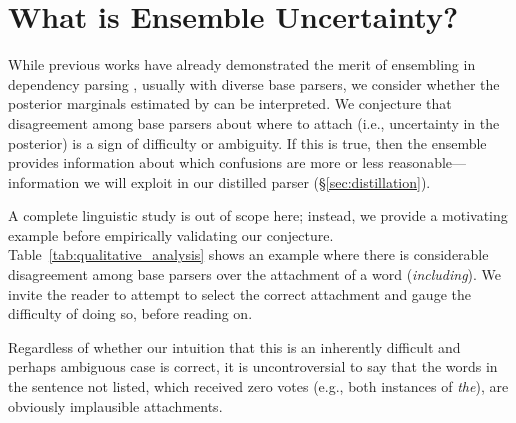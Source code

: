 \documentclass[11pt,letterpaper]{article}
\newcommand{\ignore}[1]{}
\newcommand{\nascomment}[1]{\ignore{\textcolor{blue}{{\textbf{[#1 --\textsc{nas}]}}}}}
\begin{document}
\ignore{\nascomment{need to explicitly compare to SOTA if we are going to claim it.  I have done so.}}
\section{What is Ensemble Uncertainty?}\label{sec:ensemble_ambiguity}

While previous works have already demonstrated the merit of ensembling in dependency parsing \cite{ensemble_reparsing,ensemble_cheap_and_good}, usually with diverse base parsers, we consider whether the posterior
marginals estimated by  can be interpreted.  
We conjecture that disagreement among base parsers about where to attach  (i.e., uncertainty in the posterior) is a sign of difficulty or ambiguity.  If this is true, then the ensemble provides information about which confusions are more or less reasonable---information we will exploit in our distilled  parser (\S\ref{sec:distillation}).

A complete linguistic study is out of scope here; instead, we provide a motivating example before empirically validating our conjecture.
Table~\ref{tab:qualitative_analysis} shows an example where there is considerable disagreement among base parsers over the attachment of a word (\emph{including}). We invite the reader to attempt to select the correct attachment and gauge the difficulty of doing so, before reading on.

Regardless of whether our intuition that this is an inherently difficult and perhaps ambiguous case is correct, it is uncontroversial to say that the words in the sentence not listed, which received zero votes (e.g., both instances of \emph{the}), are obviously implausible attachments.
\end{document}
